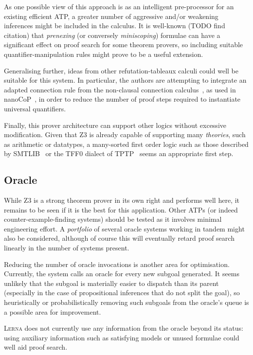 \documentclass[runningheads]{llncs}
\newcommand{\lerna}{\textsc{Lerna}}
\newcommand{\z}[1]{\textsc{Z3}}
\begin{document}
As one possible view of this approach is as an intelligent pre-processor for an existing efficient ATP, a greater number of aggressive and/or weakening inferences might be included in the calculus.
It is well-known (TODO find citation) that \emph{prenexing} (or conversely \emph{miniscoping}) formulae can have a significant effect on proof search for some theorem provers, so including suitable quantifier-manipulation rules might prove to be a useful extension.

Generalising further, ideas from other refutation-tableaux calculi could well be suitable for this system.
In particular, the authors are attempting to integrate an adapted connection rule from the non-clausal connection calculus~\cite{non-clausal-connections}, as used in nanoCoP~\cite{nanocop}, in order to reduce the number of proof steps required to instantiate universal quantifiers.

Finally, this prover architecture can support other logics without excessive modification.
Given that \z3 is already capable of supporting many \emph{theories}, such as arithmetic or datatypes, a many-sorted first order logic such as those described by SMTLIB~\cite{smtlib} or the TFF0 dialect of TPTP~\cite{tff0} seems an appropriate first step.

\subsection{Oracle}
While \z3 is a strong theorem prover in its own right and performs well here, it remains to be seen if it is the best for this application.
Other ATPs (or indeed counter-example-finding systems) should be tested as it involves minimal engineering effort.
A \emph{portfolio} of several oracle systems working in tandem might also be considered, although of course this will eventually retard proof search linearly in the number of systems present.

Reducing the number of oracle invocations is another area for optimisation.
Currently, the system calls an oracle for every new subgoal generated.
It seems unlikely that the subgoal is materially easier to dispatch than its parent (especially in the case of propositional inferences that do not split the goal), so heuristically or probabilistically removing such subgoals from the oracle's queue is a possible area for improvement.

\lerna{} does not currently use any information from the oracle beyond its status: using auxiliary information such as satisfying models or unused formulae could well aid proof search.
\end{document}

